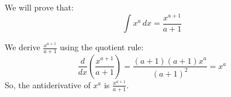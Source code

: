 We will prove that:
\[\int x^a \, dx = \frac{x^{a+1}}{a+1}\]

We derive \(\frac{x^{a+1}}{a+1}\) using the quotient rule:
\[\frac{d}{dx} \left( \frac{x^{a+1}}{a+1} \right) = \frac{(a+1)(a+1)x^a}{(a+1)^2} = x^a\]
So, the antiderivative of \(x^a\) is \(\frac{x^{a+1}}{a+1}\).
